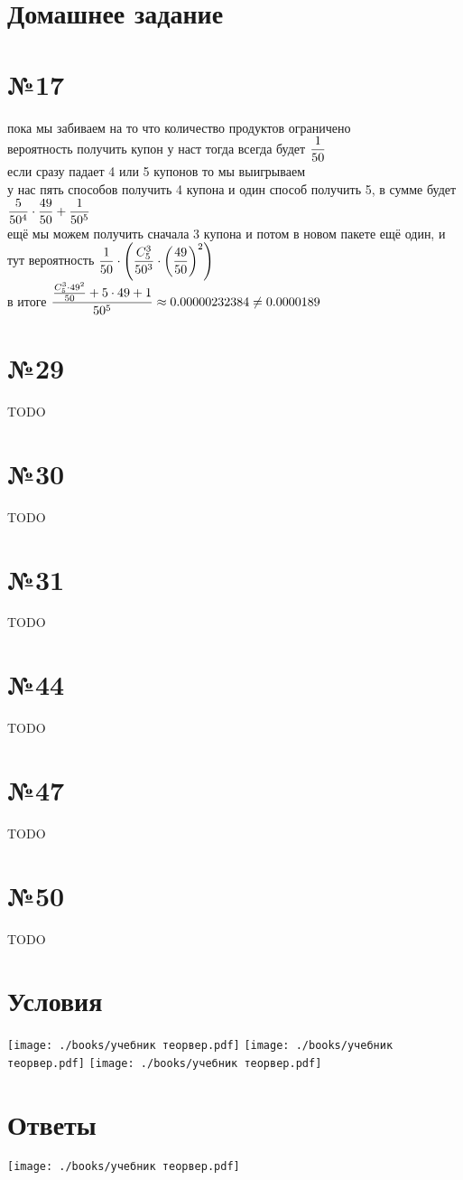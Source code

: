 \documentclass{article}
\newcommand{\hr}{\par\vspace{.5\baselineskip}\noindent\hrulefill\par}
\begin{document}
  \hr
  \section*{Домашнее задание}
  \section*{№17}
  пока мы забиваем на то что количество продуктов ограничено \\
  вероятность получить купон у наст тогда всегда будет $\displaystyle \frac{1}{50}$ \\
  если сразу падает 4 или 5 купонов то мы выигрываем \\
  у нас пять способов получить 4 купона и один способ получить 5, в сумме будет $\displaystyle \frac{5}{50^4} \cdot \frac{49}{50} + \frac{1}{50^5}$ \\
  ещё мы можем получить сначала 3 купона и потом в новом пакете ещё один, и тут вероятность
  $\displaystyle \frac{1}{50} \cdot \left(\frac{C_5^3}{50^3} \cdot \left(\frac{49}{50}\right)^2\right)$ \\
  в итоге $\displaystyle \frac{\frac{C_5^3 \cdot 49^2}{50} + 5 \cdot 49 + 1}{50^5} \approx 0.00000232384 \neq 0.0000189$

  \section*{№29}
  TODO

  \section*{№30}
  TODO

  \section*{№31}
  TODO

  \section*{№44}
  TODO

  \section*{№47}
  TODO

  \section*{№50}
  TODO


  \hr
  \section*{Условия}
  \texttt{[image: ./books/учебник теорвер.pdf]} \hfill
  \texttt{[image: ./books/учебник теорвер.pdf]} \hfill
  \texttt{[image: ./books/учебник теорвер.pdf]} \hfill

  \section*{Ответы}
  \texttt{[image: ./books/учебник теорвер.pdf]}
\end{document}
